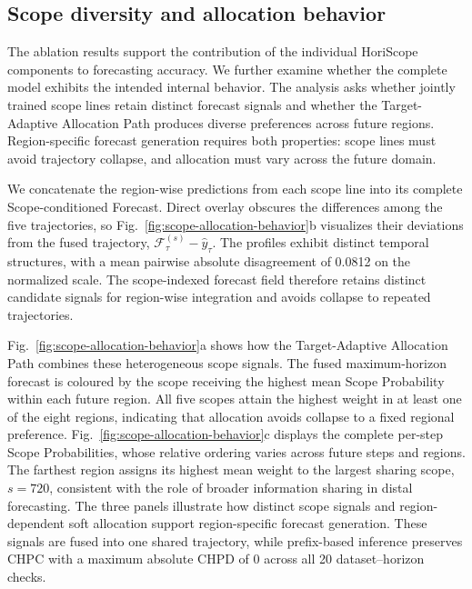\documentclass[final,3p,times]{elsarticle}
\begin{document}
\subsection{Scope diversity and allocation behavior}
\label{sec:scope-behavior}


The ablation results support the contribution of the individual HoriScope components to forecasting accuracy. We further examine whether the complete model exhibits the intended internal behavior. The analysis asks whether jointly trained scope lines retain distinct forecast signals and whether the Target-Adaptive Allocation Path produces diverse preferences across future regions. Region-specific forecast generation requires both properties: scope lines must avoid trajectory collapse, and allocation must vary across the future domain.

We concatenate the region-wise predictions from each scope line into its complete Scope-conditioned Forecast. Direct overlay obscures the differences among the five trajectories, so Fig.~\ref{fig:scope-allocation-behavior}b visualizes their deviations from the fused trajectory, $\mathcal F_\tau^{(s)}-\widehat y_\tau$. The profiles exhibit distinct temporal structures, with a mean pairwise absolute disagreement of 0.0812 on the normalized scale. The scope-indexed forecast field therefore retains distinct candidate signals for region-wise integration and avoids collapse to repeated trajectories.

Fig.~\ref{fig:scope-allocation-behavior}a shows how the Target-Adaptive Allocation Path combines these heterogeneous scope signals. The fused maximum-horizon forecast is coloured by the scope receiving the highest mean Scope Probability within each future region. All five scopes attain the highest weight in at least one of the eight regions, indicating that allocation avoids collapse to a fixed regional preference. Fig.~\ref{fig:scope-allocation-behavior}c displays the complete per-step Scope Probabilities, whose relative ordering varies across future steps and regions. The farthest region assigns its highest mean weight to the largest sharing scope, $s=720$, consistent with the role of broader information sharing in distal forecasting. The three panels illustrate how distinct scope signals and region-dependent soft allocation support region-specific forecast generation. These signals are fused into one shared trajectory, while prefix-based inference preserves CHPC with a maximum absolute CHPD of 0 across all 20 dataset--horizon checks.
\end{document}
